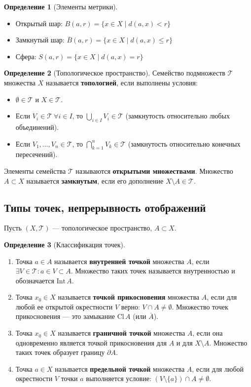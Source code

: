 \documentclass[12pt,a4paper]{article}
\theoremstyle{definition}
\newtheorem{definition}{Определение}[section]
\begin{document}
\begin{definition}[Элементы метрики]
\begin{itemize}
    \item Открытый шар: $B(a, r) = \{x \in X \mid d(a, x) < r\}$
    \item Замкнутый шар: $\overline{B}(a, r) = \{x \in X \mid d(a, x) \leqslant r\}$
    \item Сфера: $S(a, r) = \{x \in X \mid d(a, x) = r\}$
\end{itemize}
\end{definition}

\begin{definition}[Топологическое пространство]
Семейство подмножеств $\mathcal{T}$ множества $X$ называется \textbf{топологией}, если выполнены условия:
\begin{itemize}
    \item[($\mathcal{T}1$)] $\emptyset \in \mathcal{T}$ и $X \in \mathcal{T}$.
    \item[($\mathcal{T}2$)] Если $V_i \in \mathcal{T} \ \forall i \in I$, то $\bigcup_{i \in I} V_i \in \mathcal{T}$ (замкнутость относительно любых объединений).
    \item[($\mathcal{T}3$)] Если $V_1, \dots, V_n \in \mathcal{T}$, то $\bigcap_{k=1}^n V_k \in \mathcal{T}$ (замкнутость относительно конечных пересечений).
\end{itemize}
Элементы семейства $\mathcal{T}$ называются \textbf{открытыми множествами}. Множество $A \subset X$ называется \textbf{замкнутым}, если его дополнение $X \setminus A \in \mathcal{T}$.
\end{definition}\subsection{Типы точек, непрерывность отображений}

Пусть $(X, \mathcal{T})$ --- топологическое пространство, $A \subset X$.

\begin{definition}[Классификация точек]
\begin{enumerate}
    \item Точка $a \in A$ называется \textbf{внутренней точкой} множества $A$, если $\exists V \in \mathcal{T} : a \in V \subset A$. Множество таких точек называется внутренностью и обозначается $\text{Int}\,A$.
    \item Точка $x_0 \in X$ называется \textbf{точкой прикосновения} множества $A$, если для любой ее открытой окрестности $V$ верно: $V \cap A \neq \emptyset$. Множество точек прикосновения --- это замыкание $\text{Cl}\,A$ (или $\overline{A}$).
    \item Точка $x_0 \in X$ называется \textbf{граничной точкой} множества $A$, если она одновременно является точкой прикосновения для $A$ и для $X \setminus A$. Множество таких точек образует границу $\partial A$.
    \item Точка $a \in X$ называется \textbf{предельной точкой} множества $A$, если для любой окрестности $V$ точки $a$ выполняется условие: $(V \setminus \{a\}) \cap A \neq \emptyset$.
\end{enumerate}
\end{definition}
\end{document}
